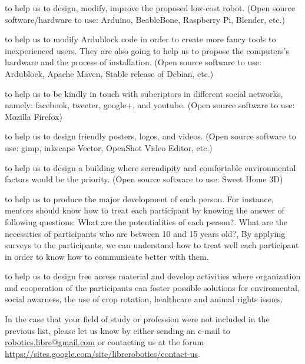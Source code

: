 \begin{description}[noitemsep,topsep=0pt,parsep=0pt,partopsep=0pt]
\item[Mechatronic/Electronic/Mechanical Engineers]  
to help us to design, modify, improve the proposed low-cost robot.
(Open source software/hardware to use: Arduino, BeableBone, Raspberry Pi, Blender, etc.)

\item[Computer Engineers] to help us to modify Ardublock code in order to create more 
fancy tools to inexperienced users. They are also going to help us to propose the 
computers's hardware and the process of installation. (Open source software to use: 
Ardublock, Apache Maven, Stable release of Debian, etc.)

\item[Webpage and social-network maintainers] to help us to be kindly in touch with 
subcriptors in different social networks, namely: facebook, tweeter, google+, and 
youtube. (Open source software to use: Mozilla Firefox)

\item[Graphical designers/ animator /artists] to help us to design friendly posters, 
logos, and videos. (Open source software to use: gimp, inkscape Vector, OpenShot Video 
Editor, etc.) 

\item[Architects] to help us to design a building where serendipity and comfortable 
environmental factors would be the priority. (Open source software to use: 
Sweet Home 3D)

\item[Psychologists] to help us to produce the major development of each person. For 
instance, mentors should know how to treat each participant by knowing  the answer of 
following questions: What are the potentialities of each person?. What are the necessities 
of participants who are between 10 and 15 years old?, By applying surveys to the 
participants, we can understand how to treat well each  participant in order to know 
how to communicate  better with them.

\item[Pedagogues] to help us to design free access material and develop activities 
 where organization and cooperation of the participants can foster
 possible solutions for enviromental, social awarness, the use of crop rotation,
 healthcare and animal rights issues.
 
\end{description}

In the case that your field of study or profession were not included in the previous list, 
please let us know by either sending an e-mail to \href{mailto:robotics.libre@gmail.com}
{robotics.libre@gmail.com} or contacting us at the forum 
\href{https://sites.google.com/site/librerobotics/contact-us}
{https://sites.google.com/site/librerobotics/contact-us}.













